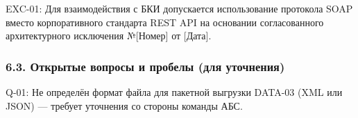 \documentclass[10pt,a4paper]{article}
\begin{document}
EXC-01: Для взаимодействия с БКИ допускается использование протокола SOAP вместо корпоративного стандарта REST API на основании согласованного архитектурного исключения №{[}Номер{]} от {[}Дата{]}.

\subsubsection{6.3. Открытые вопросы и пробелы (для уточнения)}\label{63-ux43eux442ux43aux440ux44bux442ux44bux435-ux432ux43eux43fux440ux43eux441ux44b-ux438-ux43fux440ux43eux431ux435ux43bux44b-ux434ux43bux44f-ux443ux442ux43eux447ux43dux435ux43dux438ux44f}

Q-01: Не определён формат файла для пакетной выгрузки DATA-03 (XML или JSON) --- требует уточнения со стороны команды АБС.
\end{document}
